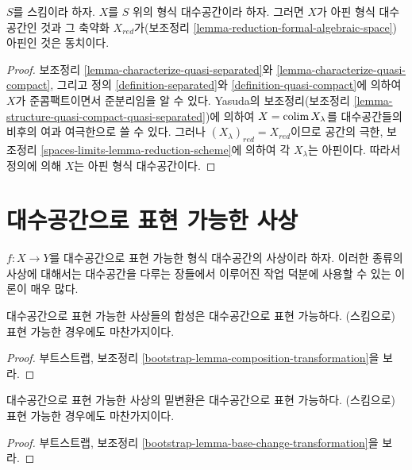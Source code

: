 \begin{lemma}
\label{lemma-characterize-affine}
$S$를 스킴이라 하자. $X$를 $S$ 위의 형식 대수공간이라 하자.
그러면 $X$가 아핀 형식 대수공간인 것과 그 축약화
$X_{red}$가(보조정리 \ref{lemma-reduction-formal-algebraic-space})
아핀인 것은 동치이다.
\end{lemma}

\begin{proof}
보조정리 \ref{lemma-characterize-quasi-separated}와
\ref{lemma-characterize-quasi-compact}, 그리고 정의
\ref{definition-separated}와 \ref{definition-quasi-compact}에 의하여
$X$가 준콤팩트이면서 준분리임을 알 수 있다.
Yasuda의 보조정리(보조정리
\ref{lemma-structure-quasi-compact-quasi-separated})에 의하여
$X = \mathop{\mathrm{colim}}\nolimits X_\lambda$를 대수공간들의 비후의 여과 여극한으로 쓸 수
있다. 그러나 $(X_\lambda)_{red} = X_{red}$이므로 공간의 극한,
보조정리 \ref{spaces-limits-lemma-reduction-scheme}에 의하여
각 $X_\lambda$는 아핀이다. 따라서 정의에 의해 $X$는
아핀 형식 대수공간이다.
\end{proof}

\section{대수공간으로 표현 가능한 사상}
\label{section-representable}

\noindent
$f : X \to Y$를 대수공간으로 표현 가능한 형식 대수공간의
사상이라 하자. 이러한 종류의 사상에 대해서는 대수공간을 다루는
장들에서 이루어진 작업 덕분에 사용할 수 있는 이론이 매우 많다.

\begin{lemma}
\label{lemma-composition-representable}
대수공간으로 표현 가능한 사상들의 합성은 대수공간으로 표현
가능하다. (스킴으로) 표현 가능한 경우에도 마찬가지이다.
\end{lemma}

\begin{proof}
부트스트랩, 보조정리
\ref{bootstrap-lemma-composition-transformation}을 보라.
\end{proof}

\begin{lemma}
\label{lemma-base-change-representable}
대수공간으로 표현 가능한 사상의 밑변환은 대수공간으로 표현
가능하다. (스킴으로) 표현 가능한 경우에도 마찬가지이다.
\end{lemma}

\begin{proof}
부트스트랩, 보조정리
\ref{bootstrap-lemma-base-change-transformation}을 보라.
\end{proof}

